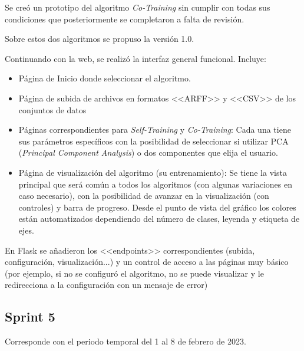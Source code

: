 Se creó un prototipo del algoritmo \textit{Co-Training} sin cumplir con todas sus
condiciones que posteriormente se completaron a falta de revisión. 

Sobre estos dos algoritmos se propuso la versión 1.0. 

Continuando con la web, se realizó la interfaz general funcional. Incluye:
\begin{itemize}
    \item Página de Inicio donde seleccionar el algoritmo.
    \item Página de subida de archivos en formatos <<ARFF>> y <<CSV>> de los
    conjuntos de datos
    \item Páginas correspondientes para \textit{Self-Training} y
    \textit{Co-Training}: Cada una tiene sus parámetros específicos con la
    posibilidad de seleccionar si utilizar PCA (\textit{Principal Component
    Analysis}) o dos componentes que elija el usuario.
    \item Página de visualización del algoritmo (su entrenamiento): Se tiene la
    vista principal que será común a todos los algoritmos (con algunas
    variaciones en caso necesario), con la posibilidad de avanzar en la
    visualización (con controles) y barra de progreso. Desde el punto de vista
    del gráfico los colores están automatizados dependiendo del número de
    clases, leyenda y etiqueta de ejes.
\end{itemize}

En Flask se añadieron los <<endpoints>> correspondientes (subida, configuración,
visualización...) y un control de acceso a las páginas muy básico (por ejemplo,
si no se configuró el algoritmo, no se puede visualizar y le redirecciona a la
configuración con un mensaje de error)

\subsection{Sprint 5}
Corresponde con el periodo temporal del 1 al 8 de febrero de 2023.

